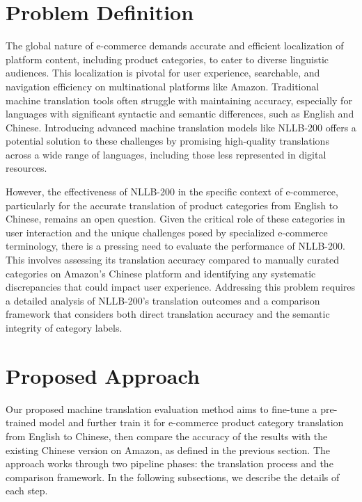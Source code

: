 \documentclass[sigconf]{acmart}
\begin{document}
\section{Problem Definition}
The global nature of e-commerce demands accurate and efficient localization of platform content, including product categories, to cater to diverse linguistic audiences. This localization is pivotal for user experience, searchable, and navigation efficiency on multinational platforms like Amazon. Traditional machine translation tools often struggle with maintaining accuracy, especially for languages with significant syntactic and semantic differences, such as English and Chinese.\cite{brazill_masters_munday_2017} Introducing advanced machine translation models like NLLB-200 offers a potential solution to these challenges by promising high-quality translations across a wide range of languages, including those less represented in digital resources.

However, the effectiveness of NLLB-200 in the specific context of e-commerce, particularly for the accurate translation of product categories from English to Chinese, remains an open question. Given the critical role of these categories in user interaction and the unique challenges posed by specialized e-commerce terminology, there is a pressing need to evaluate the performance of NLLB-200. This involves assessing its translation accuracy compared to manually curated categories on Amazon's Chinese platform and identifying any systematic discrepancies that could impact user experience.\cite{chang_2022} Addressing this problem requires a detailed analysis of NLLB-200's translation outcomes and a comparison framework that considers both direct translation accuracy and the semantic integrity of category labels.

\section{Proposed Approach}\label{approach}
Our proposed machine translation evaluation method aims to fine-tune a pre-trained model and further train it for e-commerce product category translation from English to Chinese, then compare the accuracy of the results with the existing Chinese version on Amazon, as defined in the previous section. The approach works through two pipeline phases: the translation process and the comparison framework. In the following subsections, we describe the details of each step.
\end{document}
